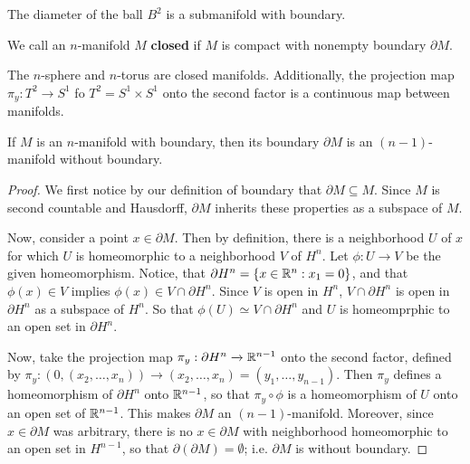 \begin{example}\label{example.1.4}
    The diameter of the ball $B^2$ is a submanifold with boundary.
\end{example}

\begin{definition}
    We call an $n$-manifold $M$ \textbf{closed} if $M$ is compact with nonempty
    boundary $\partial{M}$.
\end{definition}

\begin{example}\label{example_1.5}
    The $n$-sphere and  $n$-torus are closed manifolds. Additionally, the
    projection map  $\pi_y:T^2 \xrightarrow{} S^1$ fo $T^2=S^1 \times S^1$ onto
    the second factor is a continuous map between manifolds.
\end{example}

\begin{lemma}\label{1.1.4}
    If $M$ is an  $n$-manifold with boundary, then its boundary  $\partial{M}$ is
    an $(n-1)$-manifold without boundary.
\end{lemma}
\begin{proof}
    We first notice by our definition of boundary that $\partial{M} \subseteq M$.
    Since $M$ is second countable and Hausdorff,  $\partial{M}$ inherits these
    properties as a subspace of $M$.

    Now, consider a point $x \in \partial{M}$. Then by definition, there is a
    neighborhood $U$ of  $x$ for which  $U$ is homeomorphic to a neighborhood
    $V$ of $H^n$. Let $\phi:U \xrightarrow{} V$ be the given homeomorphism.
    Notice, that $\partial{H^n} = \{x \in \mathbb{R}^n : x_1=0\}$, and that $\phi(x) \in
    V$ implies $\phi(x) \in V \cap \partial{H^n}$. Since $V$ is open in $H^n$,
    $V \cap \partial{H^n}$ is open in $\partial{H^n}$ as a subspace of $H^n$.
    So that $\phi(U) \simeq V \cap \partial{H^n}$ and $U$ is homeomprphic to an
    open set in  $\partial{H^n}$.

    Now, take the projection map $\pi_y:\partial{H^n} \xrightarrow{} \mathbb{R}^{n-1}$
    onto the second factor, defined by $\pi_y:(0,(x_2, \dots, x_n))
    \xrightarrow{} (x_2, \dots, x_n)=(y_1, \dots, y_{n-1})$. Then $\pi_y$
    defines a homeomorphism of  $\partial{H^n}$ onto $\mathbb{R}^{n-1}$, so that $\pi_y
    \circ \phi$ is a homeomorphism of  $U$ onto an open set of  $\mathbb{R}^{n-1}$. This
    makes $\partial{M}$ an $(n-1)$-manifold. Moreover, since $x \in \partial{M}$
    was arbitrary, there is no $x \in \partial{M}$ with neighborhood
    homeomorphic to an open set in $H^{n-1}$, so that
    $\partial{(\partial{M})}=\emptyset$; i.e. $\partial{M}$ is without boundary.
\end{proof}
